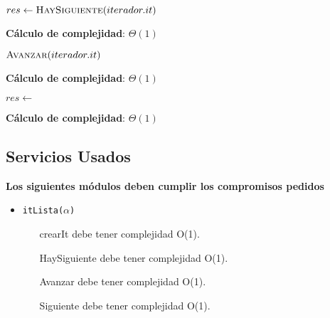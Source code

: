 \documentclass[10pt, a4paper]{article}
\let\TipoVariable=\texttt
\let\ModificadorArgumento=\textbf
\newcommand{\In}[2]{\ModificadorArgumento{in} \ensuremath{#1}\,: \TipoVariable{#2}\xspace}
\newcommand{\Inout}[2]{\ModificadorArgumento{in/out} \ensuremath{#1}\,: \TipoVariable{#2}\xspace}
\newcommand{\DRef}{\ensuremath{\rightarrow}}
\begin{document}
\begin{algorithm}[H]
\caption*{iHayMas?(\In{iterador}{iteradorUni($\alpha$)}) $\DRef res$ : \TipoVariable{Bool}}
\begin{algorithmic}[1]
	\State $res \gets \Call{HaySiguiente}{iterador.it}$
\end{algorithmic}
	\textbf{C\'alculo de complejidad}: $\Theta(1)$
\end{algorithm}

\begin{algorithm}[H]
\caption*{iSiguiente(\Inout{iterador}{iteradorUni($\alpha$)})}
\begin{algorithmic}[1]
	\State $\Call{Avanzar}{iterador.it}$
\end{algorithmic}
	\textbf{C\'alculo de complejidad}: $\Theta(1)$
\end{algorithm}

\begin{algorithm}[H]
\caption*{iActual(\In{iterador}{iteradorUni($\alpha$)}) $\DRef res$ : {$\alpha$}}
\begin{algorithmic}[1]
	\State $res \gets$ 
\end{algorithmic}
	\textbf{C\'alculo de complejidad}: $\Theta(1)$
\end{algorithm}

\subsection{Servicios Usados}

\textbf{Los siguientes m\'odulos deben cumplir los compromisos pedidos}

\begin{itemize}
	\item \TipoVariable{itLista($\alpha$)}
	\begin{itemize}
		\item[crearIt] debe tener complejidad O(1).
		\item[HaySiguiente] debe tener complejidad O(1).
		\item[Avanzar] debe tener complejidad O(1).
		\item[Siguiente] debe tener complejidad O(1).
	\end{itemize} 
\end{itemize}
\end{document}
